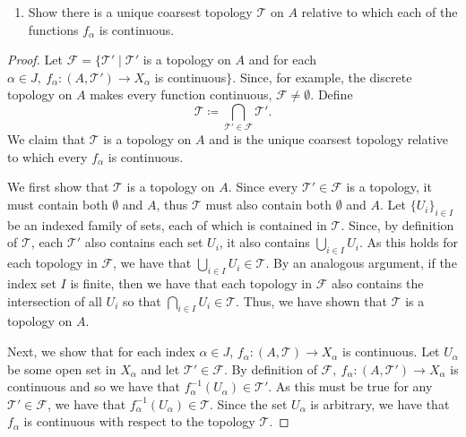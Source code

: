 \documentclass[a4paper,10pt]{article}
\newcommand{\inv}{^{-1}}
\begin{document}
\begin{solution}
    \begin{enumerate}[label={(\alph*)}, align=left, leftmargin=\parindent, listparindent=\parindent, labelwidth=0pt, itemindent=!]
        \item Show there is a unique coarsest topology $\mathcal{T}$ on $A$ relative to which each of the functions $f_\alpha$ is continuous.
    \end{enumerate}
    \begin{proof}
        Let $\mathcal{F} = \{\mathcal{T}' \mid \mathcal{T}'$ is a topology on $A$ and for each $\alpha \in J,~ f_\alpha: (A, \mathcal{T}') \rightarrow X_\alpha$ is continuous$\}$.
        Since, for example, the discrete topology on $A$ makes every function continuous, $\mathcal{F} \neq \emptyset$.
        Define
        \begin{equation*}
            \mathcal{T} \coloneq \bigcap_{\mathcal{T}' \in \mathcal{F}} \mathcal{T}'.
        \end{equation*}
        We claim that $\mathcal{T}$ is a topology on $A$ and is the unique coarsest topology relative to which every $f_\alpha$ is continuous.

        We first show that $\mathcal{T}$ is a topology on $A$.
        Since every $\mathcal{T}' \in \mathcal{F}$ is a topology, it must contain both $\emptyset$ and $A$, thus $\mathcal{T}$ must also contain both $\emptyset$ and $A$.
        Let $\{U_i\}_{i \in I}$ be an indexed family of sets, each of which is contained in $\mathcal{T}$.
        Since, by definition of $\mathcal{T}$, each $\mathcal{T}'$ also contains each set $U_i$, it also contains $\bigcup_{i \in I} U_i$.
        As this holds for each topology in $\mathcal{F}$, we have that $\bigcup_{i \in I} U_i \in \mathcal{T}$.
        By an analogous argument, if the index set $I$ is finite, then we have that each topology in $\mathcal{F}$ also contains the intersection of all $U_i$ so that $\bigcap_{i \in I} U_i \in \mathcal{T}$.
        Thus, we have shown that $\mathcal{T}$ is a topology on $A$.

        Next, we show that for each index $\alpha \in J$, $f_\alpha: (A, \mathcal{T}) \rightarrow X_\alpha$ is continuous.
        Let $U_\alpha$ be some open set in $X_\alpha$ and let $\mathcal{T}' \in \mathcal{F}$.
        By definition of $\mathcal{F},~ f_\alpha: (A, \mathcal{T}') \rightarrow X_\alpha$ is continuous and so we have that $f_\alpha\inv(U_\alpha) \in \mathcal{T}'$.
        As this must be true for any $\mathcal{T}' \in \mathcal{F}$, we have that $f_\alpha\inv(U_\alpha) \in \mathcal{T}$.
        Since the set $U_\alpha$ is arbitrary, we have that $f_\alpha$ is continuous with respect to the topology $\mathcal{T}$.


\end{proof}
\end{solution}
\end{document}
